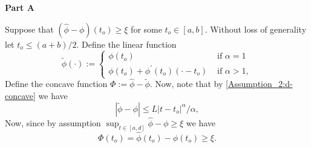 \documentclass{article} %
\begin{document}
\textbf{Part A}

Suppose that $(\widehat{\phi}-\phi)\left(t_o\right) \geq \xi$ for some $t_o \in[a, b]$. Without loss of generality let $t_o \leq(a+b) / 2$. Define the linear function
$$
\widetilde{\phi}(\cdot):=\left\{\begin{array}{cc}
\phi\left(t_o\right) & \text { if } \alpha=1 \\
\phi\left(t_o\right)+\phi^{\prime}\left(t_o\right)\left(\cdot-t_o\right) & \text { if } \alpha>1,
\end{array}\right.
$$
Define the concave function $\Phi := \widehat{\phi}-\widetilde{\phi}$. Now, note that by \cref{Assumption_2:d-concave} we have 
\begin{equation}\label{dumbgen:Phi_Lipsh}
|\widetilde{\phi}-\phi| \leq L |t-t_o|^{\alpha}/\alpha,
\end{equation}
Now, since by assumption $\sup_{t\in [a,d]} \widehat{\phi} -\phi \geq \xi$ we have 
\begin{equation}\label{dumbgen:Phi}
\Phi(t_o) = \widehat{\phi}(t_o)-\phi (t_o) \geq \xi.
\end{equation}
\end{document}
